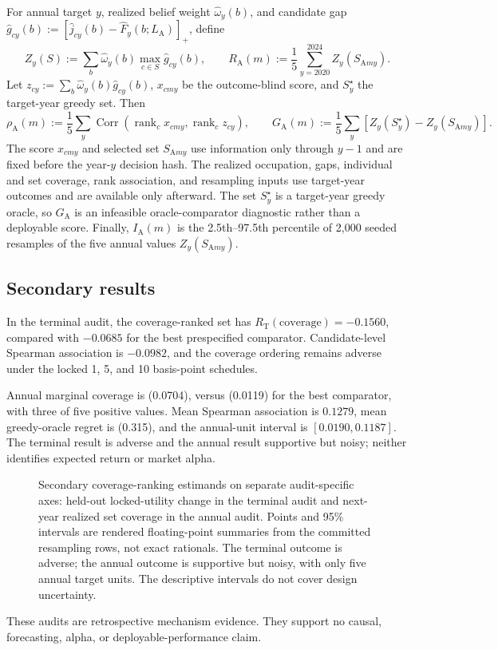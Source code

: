 For annual target \(y\), realized belief weight \(\widehat\omega_y(b)\), and
candidate gap
\(\widehat g_{cy}(b):=
[\widehat j_{cy}(b)-\widehat F_y(b;L_{\mathrm A})]_+\), define
\[
 Z_y(S):=\sum_b\widehat\omega_y(b)\max_{c\in S}\widehat g_{cy}(b),
 \qquad
 R_{\mathrm A}(m):=\frac15\sum_{y=2020}^{2024}Z_y(S_{\mathrm Amy}).
\]
Let \(z_{cy}:=\sum_b\widehat\omega_y(b)\widehat g_{cy}(b)\),
\(x_{cmy}\) be the outcome-blind score, and \(S_y^\star\) the target-year
greedy set.  Then
\[
 \rho_{\mathrm A}(m):=\frac15\sum_y
   \operatorname{Corr}(\operatorname{rank}_c x_{cmy},
                       \operatorname{rank}_c z_{cy}),\qquad
 G_{\mathrm A}(m):=\frac15\sum_y
   [Z_y(S_y^\star)-Z_y(S_{\mathrm Amy})].
\]
The score \(x_{cmy}\) and selected set \(S_{\mathrm Amy}\) use information
only through \(y-1\) and are fixed before the year-\(y\) decision hash.  The
realized occupation, gaps, individual and set coverage, rank association, and
resampling inputs use target-year outcomes and are available only afterward.
The set \(S_y^\star\) is a target-year greedy oracle, so \(G_{\mathrm A}\) is
an infeasible oracle-comparator diagnostic rather than a deployable score.
Finally, \(I_{\mathrm A}(m)\) is the 2.5th--97.5th percentile of 2,000 seeded
resamples of the five annual values \(Z_y(S_{\mathrm Amy})\).

\subsection{Secondary results}

In the terminal audit, the coverage-ranked set has
\(R_{\mathrm T}(\mathrm{coverage})=-0.1560\), compared with \(-0.0685\) for
the best prespecified comparator.  Candidate-level Spearman association is
\(-0.0982\), and the coverage ordering remains adverse under the locked 1, 5,
and 10 basis-point schedules.

Annual marginal coverage is (0.0704), versus (0.0119) for the best
comparator, with three of five positive values.  Mean Spearman association is
\(0.1279\), mean greedy-oracle regret is (0.315), and the annual-unit
interval is \([0.0190,0.1187]\).  The terminal result is adverse and the
annual result supportive but noisy; neither identifies expected return or
market alpha.

\begin{figure}[htbp]
  \centering
  
  \caption{Secondary coverage-ranking estimands on separate audit-specific
  axes: held-out locked-utility change in the terminal audit and next-year
  realized set coverage in the annual audit.  Points and 95\% intervals are
  rendered floating-point summaries from the committed resampling rows, not
  exact rationals.  The terminal outcome is adverse; the annual outcome is
  supportive but noisy, with only five annual target units.  The descriptive
  intervals do not cover design uncertainty.}
  \label{fig:supp-financial-coverage-comparison}
\end{figure}

These audits are retrospective mechanism evidence.  They support no causal,
forecasting, alpha, or deployable-performance claim.
